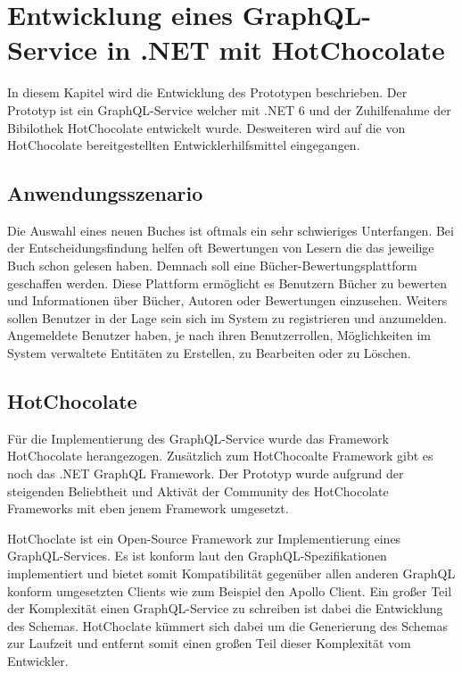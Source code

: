 \chapter{Entwicklung eines GraphQL-Service in .NET mit HotChocolate}
In diesem Kapitel wird die Entwicklung des Prototypen beschrieben.
Der Prototyp ist ein GraphQL-Service welcher mit .NET 6 und der Zuhilfenahme der Bibilothek HotChocolate entwickelt wurde.
Desweiteren wird auf die von HotChocolate bereitgestellten Entwicklerhilfsmittel eingegangen.


\section{Anwendungsszenario}
Die Auswahl eines neuen Buches ist oftmals ein sehr schwieriges Unterfangen.
Bei der Entscheidungsfindung helfen oft Bewertungen von Lesern die das jeweilige Buch schon gelesen haben.
Demnach soll eine Bücher-Bewertungsplattform geschaffen werden.
Diese Plattform ermöglicht es Benutzern Bücher zu bewerten und Informationen über Bücher, Autoren oder Bewertungen einzusehen.
Weiters sollen Benutzer in der Lage sein sich im System zu registrieren und anzumelden.
Angemeldete Benutzer haben, je nach ihren Benutzerrollen, Möglichkeiten im System verwaltete Entitäten zu Erstellen, zu Bearbeiten oder zu Löschen.

\section{HotChocolate}
Für die Implementierung des GraphQL-Service wurde das Framework HotChocolate herangezogen.
Zusätzlich zum HotChocoalte Framework gibt es noch das .NET GraphQL Framework.
Der Prototyp wurde aufgrund der steigenden Beliebtheit und Aktivät der Community des HotChocolate Frameworks mit eben jenem Framework umgesetzt.

HotChoclate ist ein Open-Source Framework zur Implementierung eines GraphQL-Services.
Es ist konform laut den GraphQL-Spezifikationen implementiert und bietet somit Kompatibilität gegenüber allen anderen GraphQL konform umgesetzten Clients wie zum Beispiel den Apollo Client.
Ein großer Teil der Komplexität einen GraphQL-Service zu schreiben ist dabei die Entwicklung des Schemas.
HotChoclate kümmert sich dabei um die Generierung des Schemas zur Laufzeit und entfernt somit einen großen Teil dieser Komplexität vom Entwickler.

